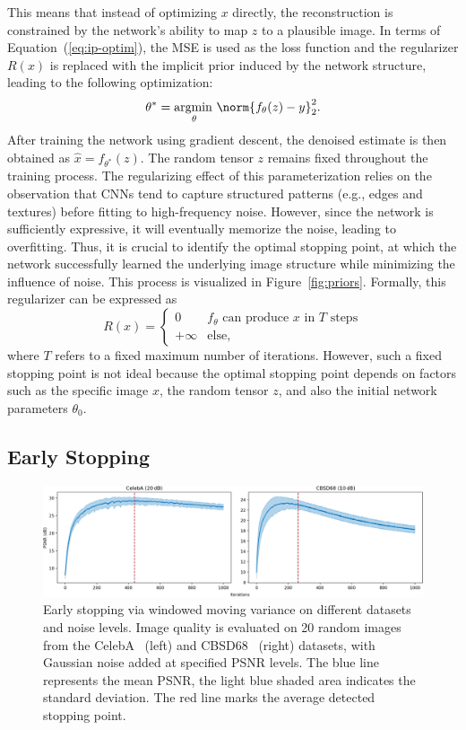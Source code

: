This means that instead of optimizing $x$ directly, the reconstruction is constrained by the network's ability to map $z$ to a plausible image.
In terms of Equation~(\ref{eq:ip-optim}), the MSE is used as the loss function and the regularizer $R(x)$ is replaced with the implicit prior induced by the network structure, leading to the following optimization:
\begin{equation}
    \theta^* = \argmin_\theta \norm{f_\theta(z) - y}_2^2.
\end{equation}
After training the network using gradient descent, the denoised estimate is then obtained as $\hat{x} = f_{\theta^*}(z)$.
The random tensor $z$ remains fixed throughout the training process.
The regularizing effect of this parameterization relies on the observation that CNNs tend to capture structured patterns (e.g., edges and textures) before fitting to high-frequency noise.
However, since the network is sufficiently expressive, it will eventually memorize the noise, leading to overfitting.
Thus, it is crucial to identify the optimal stopping point, at which the network successfully learned the underlying image structure while minimizing the influence of noise.
This process is visualized in Figure~\ref{fig:priors}.
Formally, this regularizer can be expressed as
\begin{equation}
    R(x) = \begin{cases}
        0 &\text{$f_\theta$ can produce $x$ in $T$ steps}\\
        +\infty &\text{else},
    \end{cases}
\end{equation}
where $T$ refers to a fixed maximum number of iterations.
However, such a fixed stopping point is not ideal because the optimal stopping point depends on factors such as the specific image $x$, the random tensor $z$, and also the initial network parameters $\theta_0$.

\subsection{Early Stopping}

\begin{figure}[t]
    \centering
    \includegraphics[width=\textwidth]{img/fig_4.2.png}
    \caption{
        Early stopping via windowed moving variance on different datasets and noise levels.
        Image quality is evaluated on 20 random images from the CelebA~\cite{CelebA} (left) and CBSD68~\cite{CBSD68} (right) datasets, with Gaussian noise added at specified PSNR levels.
        The blue line represents the mean PSNR, the light blue shaded area indicates the standard deviation.
        The red line marks the average detected stopping point.
    }\label{fig:early-stopping}
\end{figure}


